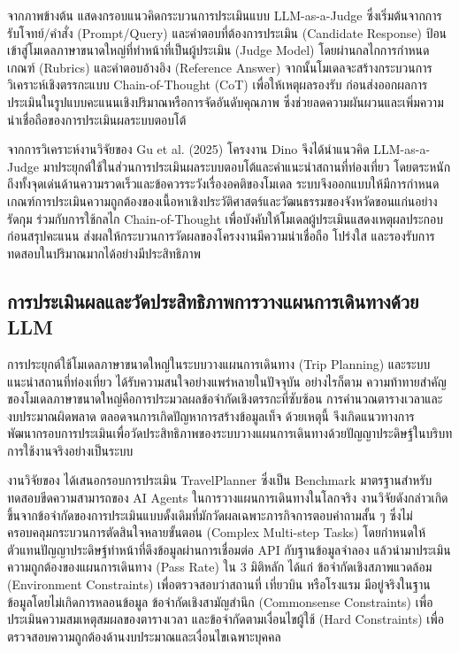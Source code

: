 จากภาพข้างต้น แสดงกรอบแนวคิดกระบวนการประเมินแบบ LLM-as-a-Judge ซึ่งเริ่มต้นจากการรับโจทย์/คำสั่ง (Prompt/Query) และคำตอบที่ต้องการประเมิน (Candidate Response) ป้อนเข้าสู่โมเดลภาษาขนาดใหญ่ที่ทำหน้าที่เป็นผู้ประเมิน (Judge Model) โดยผ่านกลไกการกำหนดเกณฑ์ (Rubrics) และคำตอบอ้างอิง (Reference Answer) จากนั้นโมเดลจะสร้างกระบวนการวิเคราะห์เชิงตรรกะแบบ Chain-of-Thought (CoT) เพื่อให้เหตุผลรองรับ ก่อนส่งออกผลการประเมินในรูปแบบคะแนนเชิงปริมาณหรือการจัดอันดับคุณภาพ ซึ่งช่วยลดความผันผวนและเพิ่มความน่าเชื่อถือของการประเมินผลระบบตอบโต้

จากการวิเคราะห์งานวิจัยของ Gu et al. (2025) โครงงาน Dino จึงได้นำแนวคิด LLM-as-a-Judge มาประยุกต์ใช้ในส่วนการประเมินผลระบบตอบโต้และคำแนะนำสถานที่ท่องเที่ยว โดยตระหนักถึงทั้งจุดเด่นด้านความรวดเร็วและข้อควรระวังเรื่องอคติของโมเดล ระบบจึงออกแบบให้มีการกำหนดเกณฑ์การประเมินความถูกต้องของเนื้อหาเชิงประวัติศาสตร์และวัฒนธรรมของจังหวัดขอนแก่นอย่างรัดกุม ร่วมกับการใช้กลไก Chain-of-Thought เพื่อบังคับให้โมเดลผู้ประเมินแสดงเหตุผลประกอบก่อนสรุปคะแนน ส่งผลให้กระบวนการวัดผลของโครงงานมีความน่าเชื่อถือ โปร่งใส และรองรับการทดสอบในปริมาณมากได้อย่างมีประสิทธิภาพ

\subsection{การประเมินผลและวัดประสิทธิภาพการวางแผนการเดินทางด้วย LLM}

การประยุกต์ใช้โมเดลภาษาขนาดใหญ่ในระบบวางแผนการเดินทาง (Trip Planning) และระบบแนะนำสถานที่ท่องเที่ยว ได้รับความสนใจอย่างแพร่หลายในปัจจุบัน อย่างไรก็ตาม ความท้าทายสำคัญของโมเดลภาษาขนาดใหญ่คือการประมวลผลข้อจำกัดเชิงตรรกะที่ซับซ้อน การคำนวณตารางเวลาและงบประมาณผิดพลาด ตลอดจนการเกิดปัญหาการสร้างข้อมูลเท็จ ด้วยเหตุนี้ จึงเกิดแนวทางการพัฒนากรอบการประเมินเพื่อวัดประสิทธิภาพของระบบวางแผนการเดินทางด้วยปัญญาประดิษฐ์ในบริบทการใช้งานจริงอย่างเป็นระบบ

งานวิจัยของ \textcite{xie2024} ได้เสนอกรอบการประเมิน TravelPlanner ซึ่งเป็น Benchmark มาตรฐานสำหรับทดสอบขีดความสามารถของ AI Agents ในการวางแผนการเดินทางในโลกจริง งานวิจัยดังกล่าวเกิดขึ้นจากข้อจำกัดของการประเมินแบบดั้งเดิมที่มักวัดผลเฉพาะภารกิจการตอบคำถามสั้น ๆ ซึ่งไม่ครอบคลุมกระบวนการตัดสินใจหลายขั้นตอน (Complex Multi-step Tasks) โดยกำหนดให้ตัวแทนปัญญาประดิษฐ์ทำหน้าที่ดึงข้อมูลผ่านการเชื่อมต่อ API กับฐานข้อมูลจำลอง แล้วนำมาประเมินความถูกต้องของแผนการเดินทาง (Pass Rate) ใน 3 มิติหลัก ได้แก่ ข้อจำกัดเชิงสภาพแวดล้อม (Environment Constraints) เพื่อตรวจสอบว่าสถานที่ เที่ยวบิน หรือโรงแรม มีอยู่จริงในฐานข้อมูลโดยไม่เกิดการหลอนข้อมูล ข้อจำกัดเชิงสามัญสำนึก (Commonsense Constraints) เพื่อประเมินความสมเหตุสมผลของตารางเวลา และข้อจำกัดตามเงื่อนไขผู้ใช้ (Hard Constraints) เพื่อตรวจสอบความถูกต้องด้านงบประมาณและเงื่อนไขเฉพาะบุคคล

